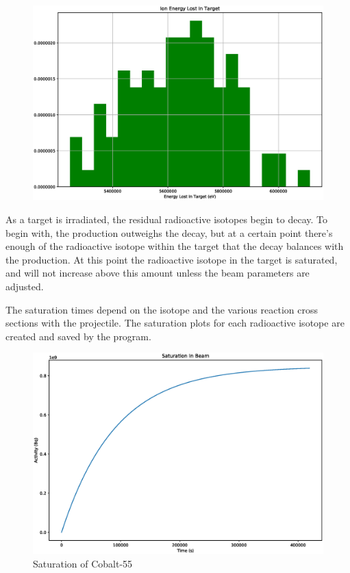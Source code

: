 \documentclass[12pt,twoside]{manual}
\begin{document}
\begin{figure}[h]
  \begin{center}
    \includegraphics[scale=0.25]{img/ion_energy_lost.eps}
  \end{center}
\end{figure}

As a target is irradiated, the residual radioactive isotopes begin to decay.  To begin with, the production outweighs the decay, but at a certain point there's enough of the radioactive isotope within the target that the decay balances with the production.  At this point the radioactive isotope in the target is saturated, and will not increase above this amount unless the beam parameters are adjusted.

The saturation times depend on the isotope and the various reaction cross sections with the projectile.  The saturation plots for each radioactive isotope are created and saved by the program.

\begin{figure}[h]
  \begin{center}
    \includegraphics[scale=0.25]{img/saturation_Co55.eps}
  \end{center}
  \caption{Saturation of Cobalt-55}
\end{figure}
\end{document}
